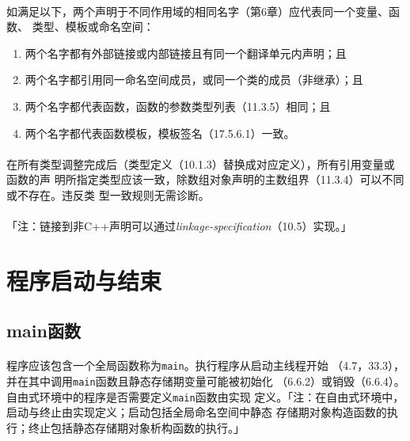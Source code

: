 \paragraph{}
如满足以下，两个声明于不同作用域的相同名字（第6章）应代表同一个变量、函数、
类型、模板或命名空间：
\begin{enumerate}
  \item{两个名字都有外部链接或内部链接且有同一个翻译单元内声明；且}
  \item{两个名字都引用同一命名空间成员，或同一个类的成员（非继承）；且}
  \item{两个名字都代表函数，函数的参数类型列表（11.3.5）相同；且}
  \item{两个名字都代表函数模板，模板签名（17.5.6.1）一致。}
\end{enumerate}

\paragraph{}
在所有类型调整完成后（类型定义（10.1.3）替换成对应定义），所有引用变量或函数的声
明所指定类型应该一致，除数组对象声明的主数组界（11.3.4）可以不同或不存在。违反类
型一致规则无需诊断。

\paragraph{}
「注：链接到非C++声明可以通过\textit{linkage-specification}（10.5）实现。」

\section{程序启动与结束}
\subsection{main函数}
\paragraph{}
程序应该包含一个全局函数称为\texttt{main}。执行程序从启动主线程开始
（4.7，33.3），并在其中调用\texttt{main}函数且静态存储期变量可能被初始化
（6.6.2）或销毁（6.6.4）。自由式环境中的程序是否需要定义\texttt{main}函数由实现
定义。「注：在自由式环境中，启动与终止由实现定义；启动包括全局命名空间中静态
存储期对象构造函数的执行；终止包括静态存储期对象析构函数的执行。」

